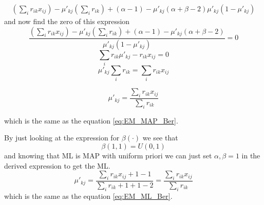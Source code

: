 \documentclass[a4paper,twoside=false,abstract=false,numbers=noenddot,
titlepage=false,headings=small,parskip=half,version=last]{scrartcl}
\begin{document}
\begin{solution}
\begin{eqnarray}
        {
            \left(\sum_i r_{ik}x_{ij}\right) - 
            \mu'_{kj}\left(\sum_i r_{ik}\right) +
            (\alpha-1)-\mu'_{kj}(\alpha+\beta-2)
        }
        {
            \mu'_{kj}(1-\mu'_{kj}) 
        }
    \end{eqnarray}
    and now find the zero of this expression
    \begin{equation}
       \frac
        {
            \left(\sum_i r_{ik}x_{ij}\right) - 
            \mu'_{kj}\left(\sum_i r_{ik}\right) +
            (\alpha-1)-\mu'_{kj}(\alpha+\beta-2)
        }
        {
            \mu'_{kj}(1-\mu'_{kj}) 
        } = 0
    \end{equation}
    \begin{equation}
         \sum\limits_i
            r_{ik}\mu'_{kj} - r_{ik}x_{ij}
         = 0
    \end{equation}
    \begin{equation}
        \mu'_{kj}\sum\limits_i r_{ik} = \sum\limits_i r_{ik} x_{ij} 
    \end{equation}

    \begin{equation}
        \mu'_{kj} = \frac{
            \sum_i r_{ik}x_{ij}
        }
        {
            \sum_i r_{ik}
        }
    \end{equation}

    which is the same as the equation \eqref{eq:EM_MAP_Ber}.
   
    By just looking at the expression for $\beta(\cdot)$ we see that
    \begin{equation}
        \beta(1,1) = U(0,1) 
    \end{equation}
    and knowing that ML is MAP with uniform priori we can just set
    $\alpha,\beta=1$ in the derived expression to get the ML.
    \begin{equation}
        \mu'_{kj} =
        \frac{\sum_ir_{ik}x_{ij}+1-1}{\sum_ir_{ik}+1+1-2} =
        \frac{\sum_ir_{ik}x_{ij}}{\sum_ir_{ik}}
    \end{equation}
    which is the same as the equation \eqref{eq:EM_ML_Ber}.

\end{solution}

\end{document}
